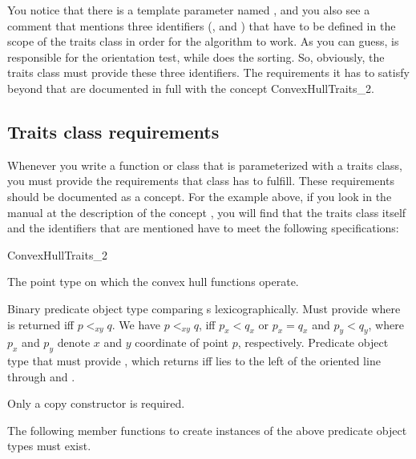 You notice that there is a template parameter named , 
and you also see a comment that mentions three identifiers (, 
 and ) that have to be defined in the
scope of the traits class in order for the algorithm to work.
As you can guess,  is responsible for the orientation 
test, while  does the sorting. So, obviously, the traits class
must provide these three identifiers. The requirements it has to satisfy
beyond that are documented in full with the concept ConvexHullTraits\_2.

\subsection{Traits class requirements\label{subsec:traits_class_requirements}}

Whenever you write a function or class that is  parameterized with a traits
class, you must provide the requirements that class has to fulfill. These
requirements should be documented as a concept.  For the
example above, if you look in the manual at the description of the concept
, you will find  that the
traits class itself and the identifiers that are mentioned have to meet the 
following specifications:

\begin{ccRefConcept}{ConvexHullTraits_2}
\ccTypes
\ccAutoIndexingOff
{}

%
       {The point type on which the convex hull functions operate.}

%
       {Binary predicate object type comparing s
        lexicographically.  Must provide
         where 
        is returned iff $p <_{xy} q$.
        We have $p<_{xy}q$, iff $p_x < q_x$ or $p_x = q_x$ and $p_y < q_y$,
        where $p_x$ and $p_y$ denote $x$ and $y$ coordinate of point $p$,
        respectively.
       }
%
       {Predicate object type that must provide
        , which
        returns  iff  lies to the left of the
        oriented line through  and .}
\ccCreation
{}  %

Only a copy constructor is required.


\ccOperations
The following member functions to create instances of the above predicate
object types must exist.

\setlength\parskip{0mm}
\ccGlue
{}

\end{ccRefConcept}
\ccAutoIndexingOn

